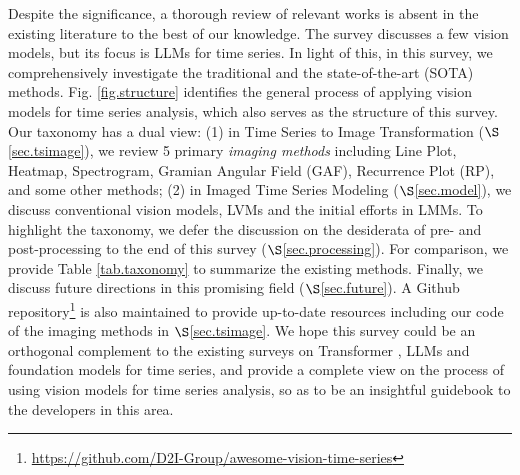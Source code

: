 Despite the significance, %
a thorough review of %
relevant works is absent in the existing literature to the best of our knowledge. The survey \cite{zhang2024large} discusses a few vision models, but its focus is %
LLMs for time series. In light of this, in this survey, we comprehensively investigate the %
traditional and the state-of-the-art (SOTA) methods. %
Fig. \ref{fig.structure} identifies the general process of applying vision models for time series analysis, which also serves as the structure of this survey. %
Our taxonomy has a dual view: (1) in Time Series to Image Transformation ($\S$\ref{sec.tsimage}), we review 5 primary {\em imaging methods} including Line Plot, Heatmap, Spectrogram, Gramian Angular Field (GAF), Recurrence Plot (RP), and some other %
methods; (2) in Imaged Time Series Modeling ($\S$\ref{sec.model}), we discuss conventional vision models, LVMs and the initial efforts in LMMs. To highlight the taxonomy, we defer the discussion on the %
desiderata of pre- and post-processing to the end of this survey ($\S$\ref{sec.processing}). For comparison, we provide Table \ref{tab.taxonomy} to %
summarize the existing methods. Finally, we discuss future directions %
in this %
promising field ($\S$\ref{sec.future}). A Github repository\footnote{\url{https://github.com/D2I-Group/awesome-vision-time-series}} is also maintained to provide up-to-date resources including our code of the imaging methods in $\S$\ref{sec.tsimage}. We hope this survey could be an orthogonal complement to the existing surveys on Transformer \cite{wen2023transformers}, LLMs \cite{zhang2024large,jiang2024empowering} and foundation models \cite{liang2024foundation} for time series, and %
provide a complete view on the process of using vision models for time series analysis, so as to be an insightful guidebook to the developers in this area.


\vspace{-0.17cm}



